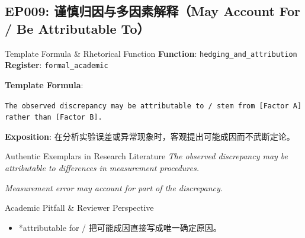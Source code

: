 \subsection{EP009: 谨慎归因与多因素解释（May Account For / Be Attributable To）}\label{sec:ep:EP009}
\begin{ConceptBox}{Template Formula \& Rhetorical Function}
\textbf{Function}: \texttt{hedging\_and\_attribution} \quad \textbf{Register}: \texttt{formal\_academic}\par\vspace{3pt}
\textbf{Template Formula}:\par\noindent\texttt{The observed discrepancy may be attributable to / stem from [Factor A] rather than [Factor B].}\par\vspace{4pt}
\textbf{Exposition}: 在分析实验误差或异常现象时，客观提出可能成因而不武断定论。
\end{ConceptBox}
\begin{ExampleBox}{Authentic Exemplars in Research Literature}
\textit{The observed discrepancy may be attributable to differences in measurement procedures.}\par\vspace{2pt}
\textit{Measurement error may account for part of the discrepancy.}\par\vspace{2pt}
\end{ExampleBox}
\begin{TipBox}{Academic Pitfall \& Reviewer Perspective}
\begin{itemize}[leftmargin=1.5em, itemsep=1pt]
  \item *attributable for / 把可能成因直接写成唯一确定原因。
\end{itemize}
\end{TipBox}
\vspace{6pt}
